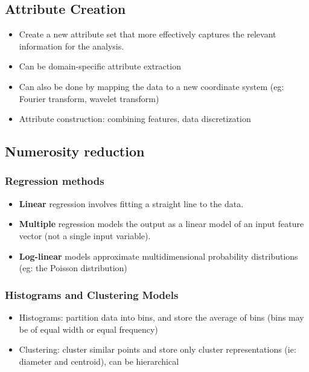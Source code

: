 \documentclass{article}
\theoremstyle{plain}
\theoremstyle{definition}
\begin{document}
\subsection{Attribute Creation}
\begin{itemize}
    \item Create a new attribute set that more effectively captures the relevant information for the analysis.
    
    \item Can be domain-specific attribute extraction
    
    \item Can also be done by mapping the data to a new coordinate system (eg: Fourier transform, wavelet transform)
    
    \item Attribute construction: combining features, data discretization
\end{itemize}

\subsection{Numerosity reduction}
\subsubsection{Regression methods}
\begin{itemize}
    \item \textbf{Linear} regression involves fitting a straight line to the data. 
    
    \item \textbf{Multiple} regression models the output as a linear model of an input feature vector (not a single input variable).
    
    \item \textbf{Log-linear} models approximate multidimensional probability distributions (eg: the Poisson distribution) 
\end{itemize}

\subsubsection{Histograms and Clustering Models}
\begin{itemize}
    \item Histograms: partition data into bins, and store the average of bins (bins may be of equal width or equal frequency)
    
    \item Clustering: cluster similar points and store only cluster representations (ie: diameter and centroid), can be hierarchical
\end{itemize}
\end{document}
